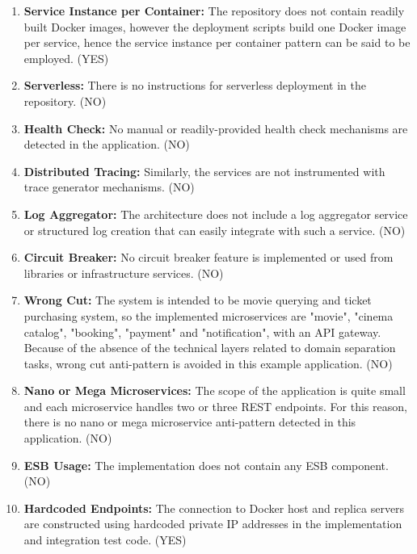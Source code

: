 \documentclass{Configuration_Files/PoliMi3i_thesis}
\begin{document}
\begin{enumerate}
    \item \textbf{Service Instance per Container:} The repository does not contain readily built Docker images, however the deployment scripts build one Docker image per service, hence the service instance per container pattern can be said to be employed. (YES)
    
    \item \textbf{Serverless:} There is no instructions for serverless deployment in the repository. (NO)
    
    \item \textbf{Health Check:} No manual or readily-provided health check mechanisms are detected in the application. (NO)
    
    \item \textbf{Distributed Tracing:} Similarly, the services are not instrumented with trace generator mechanisms. (NO)
    
    \item \textbf{Log Aggregator:} The architecture does not include a log aggregator service or structured log creation that can easily integrate with such a service. (NO)
    
    \item \textbf{Circuit Breaker:} No circuit breaker feature is implemented or used from libraries or infrastructure services. (NO)
    
    \item \textbf{Wrong Cut:} The system is intended to be movie querying and ticket purchasing system, so the implemented microservices are "movie", "cinema catalog", "booking", "payment" and "notification", with an API gateway.
    Because of the absence of the technical layers related to domain separation tasks, wrong cut anti-pattern is avoided in this example application. (NO)
    
    \item \textbf{Nano or Mega Microservices:} The scope of the application is quite small and each microservice handles two or three REST endpoints.
    For this reason, there is no nano or mega microservice anti-pattern detected in this application. (NO)
    
    \item \textbf{ESB Usage:} The implementation does not contain any ESB component. (NO)
    
    \item \textbf{Hardcoded Endpoints:} The connection to Docker host and replica servers are constructed using hardcoded private IP addresses in the implementation and integration test code. (YES)
    

\end{enumerate}
\end{document}
